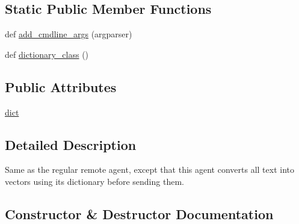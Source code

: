 \subsection*{Static Public Member Functions}
\begin{DoxyCompactItemize}
\item 
def \hyperlink{classparlai_1_1agents_1_1remote__agent_1_1remote__agent_1_1ParsedRemoteAgent_ae364a1860ec6ff9f32dabc42b96004d0}{add\+\_\+cmdline\+\_\+args} (argparser)
\item 
def \hyperlink{classparlai_1_1agents_1_1remote__agent_1_1remote__agent_1_1ParsedRemoteAgent_a5759817c6b1d248a0b64861222745f62}{dictionary\+\_\+class} ()
\end{DoxyCompactItemize}
\subsection*{Public Attributes}
\begin{DoxyCompactItemize}
\item 
\hyperlink{classparlai_1_1agents_1_1remote__agent_1_1remote__agent_1_1ParsedRemoteAgent_ac38a24353bb2fd988c9330c5c9e1434f}{dict}
\end{DoxyCompactItemize}


\subsection{Detailed Description}
\begin{DoxyVerb}Same as the regular remote agent, except that this agent converts all text into
vectors using its dictionary before sending them.
\end{DoxyVerb}
 

\subsection{Constructor \& Destructor Documentation}
\mbox{\label{classparlai_1_1agents_1_1remote__agent_1_1remote__agent_1_1ParsedRemoteAgent_a0bb2c02bb6c928455c2ee24117797e19}} 
